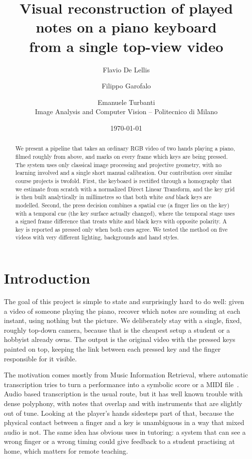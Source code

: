 \documentclass[11pt]{article}
\title{\textbf{Visual reconstruction of played notes on a piano keyboard\\
from a single top-view video}}
\author{
  Flavio De Lellis \and
  Filippo Garofalo \and
  Emanuele Turbanti \\[4pt]
  \small Image Analysis and Computer Vision -- Politecnico di Milano %
}
\date{\today} %
\begin{document}
\maketitle

\begin{abstract}
\noindent
We present a pipeline that takes an ordinary RGB video of two hands playing a
piano, filmed roughly from above, and marks on every frame which keys are being
pressed. The system uses only classical image processing and projective
geometry, with no learning involved and a single short manual calibration. Our
contribution over similar course projects is twofold. First, the keyboard is
rectified through a homography that we estimate from scratch with a normalized
Direct Linear Transform, and the key grid is then built analytically in
millimetres so that both white \emph{and} black keys are modelled. Second, the
press decision combines a spatial cue (a finger lies on the key) with a temporal
cue (the key surface actually changed), where the temporal stage uses a signed
frame difference that treats white and black keys with opposite polarity. A key
is reported as pressed only when both cues agree. We tested the method on five
videos with very different lighting, backgrounds and hand styles.
\end{abstract}

\section{Introduction}
The goal of this project is simple to state and surprisingly hard to do well:
given a video of someone playing the piano, recover which notes are sounding at
each instant, using nothing but the picture. We deliberately stay with a
single, fixed, roughly top-down camera, because that is the cheapest setup a
student or a hobbyist already owns. The output is the original video with the
pressed keys painted on top, keeping the link between each pressed key and the
finger responsible for it visible.

The motivation comes mostly from Music Information Retrieval, where automatic
transcription tries to turn a performance into a symbolic score or a MIDI
file~\cite{benetos2019transcription}. Audio based transcription is the usual
route, but it has well known trouble with dense polyphony, with notes that
overlap and with instruments that are slightly out of tune. Looking at the
player's hands sidesteps part of that, because the physical contact between a
finger and a key is unambiguous in a way that mixed audio is not. The same idea
has obvious uses in tutoring: a system that can see a wrong finger or a wrong
timing could give feedback to a student practising at home, which matters for
remote teaching.
\end{document}
